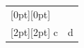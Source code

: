 \documentclass{article}
\begin{document}
\begin{tabular}{ll}
\rowcolor{gray!20}[0pt][0pt]\multicolumn{2}{l}{Group} \\
\rowcolor{gray!20}[2pt][2pt] c & d \\
\end{tabular}
\end{document}

